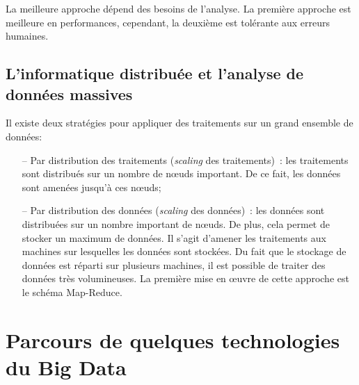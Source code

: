 		La meilleure approche dépend des besoins de l'analyse. La première approche est meilleure en performances, cependant, la deuxième est tolérante aux erreurs  humaines.
		
		
		\subsection{L'informatique distribuée et l'analyse de données massives} \label{sec:distruted-camput}
		Il existe deux stratégies pour appliquer des traitements sur un grand ensemble de données: 
		
		
		\begin{itemize}
			\item[--] Par distribution des traitements (\textit{scaling} des traitements)~: les traitements sont distribués sur un nombre de n\oe{}uds important. De ce fait, les données sont amenées jusqu'à ces n\oe{}uds;
			
			\item[--] Par distribution des données (\textit{scaling} des données)~: les données sont distribuées sur un nombre important de n\oe{}uds. De plus, cela permet  de stocker un maximum de données. Il s'agit d'amener les traitements aux machines sur lesquelles les données sont stockées. Du fait que le stockage de données est réparti sur plusieurs machines, il est possible de traiter des données très volumineuses. La première mise en \oe{}uvre de cette approche est le schéma Map-Reduce. 
		\end{itemize}
	\section{Parcours de quelques technologies du Big Data}
	
